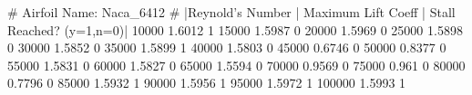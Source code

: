 # Airfoil Name: Naca_6412
# |Reynold's Number | Maximum Lift Coeff | Stall Reached? (y=1,n=0)|
10000 1.6012 1
15000 1.5987 0
20000 1.5969 0
25000 1.5898 0
30000 1.5852 0
35000 1.5899 1
40000 1.5803 0
45000 0.6746 0
50000 0.8377 0
55000 1.5831 0
60000 1.5827 0
65000 1.5594 0
70000 0.9569 0
75000 0.961 0
80000 0.7796 0
85000 1.5932 1
90000 1.5956 1
95000 1.5972 1
100000 1.5993 1
